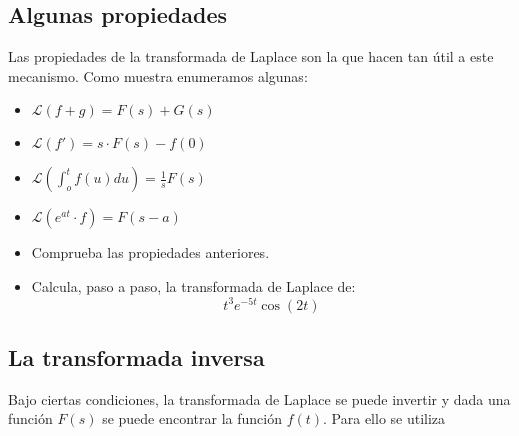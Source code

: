 \documentclass[a4paper,10pt, draft]{article}
\newcommand{\com}[1]{\textbf{\color{blue}{#1}}}
\newenvironment{ejer}{\begin{tcolorbox}[center title, title=Ejercicios,
fonttitle=\sffamily\bfseries,colback=blue!5,colframe=orange]}{\end{tcolorbox}}
\begin{document}
 \newpage



\subsection{Algunas propiedades}




Las propiedades  de la transformada de Laplace son  la que hacen tan útil a este mecanismo. Como muestra enumeramos algunas:

\begin{itemize}

\item  $\displaystyle \mathscr{L}(f+ g)= F(s)+G(s)$

\item $\displaystyle \mathscr{L}(f') = s\cdot F(s)-f(0)$

\item $\displaystyle \mathscr{L}\left(\int_o^t f(u)du\right)= \frac{1}{s} F(s)$

\item $\displaystyle \mathscr{L}(e^{at}\cdot f)= F(s-a)$




\end{itemize}

\begin{ejer}

\begin{itemize}


\item Comprueba las propiedades anteriores.


\item Calcula, paso a paso, la transformada de Laplace de:
$$
t^3e^{-5t}\cos(2t)
$$

\end{itemize}

\end{ejer} 



 \newpage


\subsection{La transformada inversa}

Bajo ciertas condiciones, la transformada de Laplace se puede invertir y dada una función $F(s)$ se puede encontrar la función $f(t)$. Para ello se utiliza \com{InverseLaplaceTransform[F,s,t]}
\end{document}
